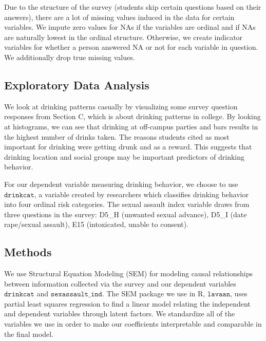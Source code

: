 \documentclass[]{article}
\begin{document}
Due to the structure of the survey (students skip certain questions
based on their answers), there are a lot of missing values induced in
the data for certain variables. We impute zero values for NAs if the
variables are ordinal and if NAs are naturally lowest in the ordinal
structure. Otherwise, we create indicator variables for whether a person
answered NA or not for each variable in question. We additionally drop
true missing values.

\hypertarget{exploratory-data-analysis}{%
\subsection{Exploratory Data Analysis}\label{exploratory-data-analysis}}

We look at drinking patterns casually by visualizing some survey
question responses from Section C, which is about drinking patterns in
college. By looking at histograms, we can see that drinking at
off-campus parties and bars results in the highest number of drinks
taken. The reasons students cited as most important for drinking were
getting drunk and as a reward. This suggests that drinking location and
social groups may be important predictors of drinking behavior.

For our dependent variable measuring drinking behavior, we choose to use
\(\texttt{drinkcat}\), a variable created by researchers which
classifies drinking behavior into four ordinal risk categories. The
sexual assault index variable draws from three questions in the survey:
D5\_H (unwanted sexual advance), D5\_I (date rape/sexual assault), E15
(intoxicated, unable to consent).

\hypertarget{methods}{%
\subsection{Methods}\label{methods}}

We use Structural Equation Modeling (SEM) for modeling causal
relationships between information collected via the survey and our
dependent variables \(\texttt{drinkcat}\) and
\(\texttt{sexassault_ind}\). The SEM package we use in R,
\(\texttt{lavaan}\), uses partial least squares regression to find a
linear model relating the independent and dependent variables through
latent factors. We standardize all of the variables we use in order to
make our coefficients interpretable and comparable in the final model.
\end{document}
